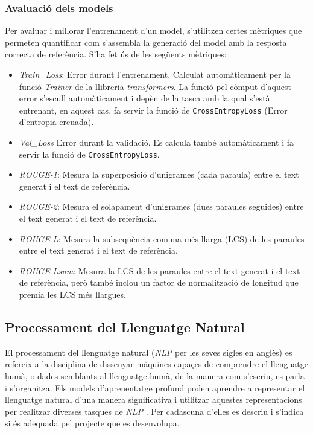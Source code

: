 \subsubsection{Avaluació dels models}
Per avaluar i millorar l'entrenament d'un model, s'utilitzen certes mètriques que permeten quantificar com s'assembla la generació del model amb la resposta correcta de referència. S'ha fet ús de les següents mètriques:
\begin{itemize}
    \item \textit{Train\_Loss}: Error durant l'entrenament. Calculat automàticament per la funció \textit{Trainer} de la llibreria \textit{transformers}. La funció pel còmput d'aquest error s'escull automàticament i depèn de la tasca amb la qual s'està entrenant, en aquest cas, fa servir la funció de \texttt{CrossEntropyLoss} (Error d'entropia creuada).
    \item \textit{Val\_Loss} Error durant la validació. Es calcula també automàticament i fa servir la funció de \texttt{CrossEntropyLoss}.
    \item \textit{ROUGE-1}: Mesura la superposició d'unigrames (cada paraula) entre el text generat i el text de referència.
    \item \textit{ROUGE-2}: Mesura el solapament d'unigrames (dues paraules seguides) entre el text generat i el text de referència.
    \item \textit{ROUGE-L}: Mesura la subseqüència comuna més llarga (LCS) de les paraules entre el text generat i el text de referència.
    \item \textit{ROUGE-Lsum}: Mesura la LCS de les paraules entre el text generat i el text de referència, però també inclou un factor de normalització de longitud que premia les LCS més llargues.
\end{itemize}

\subsection{Processament del Llenguatge Natural} \label{ssec:definicio_NLP}
El processament del llenguatge natural (\textit{NLP} per les seves sigles en anglès) es refereix a la disciplina de dissenyar màquines capaçes de comprendre el llenguatge humà, o dades semblants al llenguatge humà, de la manera com s'escriu, es parla i s'organitza. Els models d'aprenentatge profund poden aprendre a representar el llenguatge natural d'una manera significativa i utilitzar aquestes representacions per realitzar diverses tasques de \textit{NLP} \cite{Hugging-Face}. Per cadascuna d'elles es descriu i s'indica si és adequada pel projecte que es desenvolupa.


